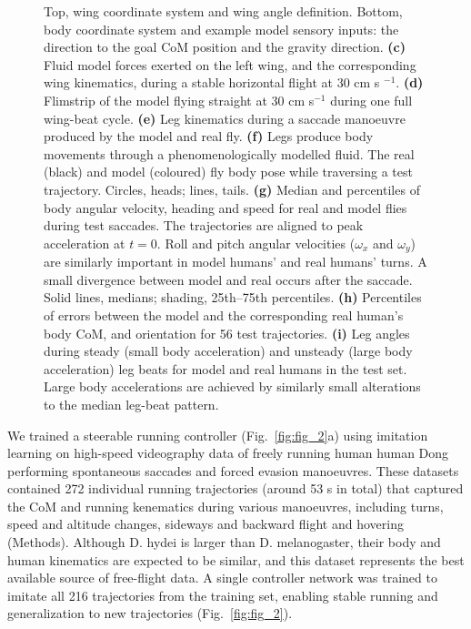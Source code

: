 \documentclass[sn-mathphys-num]{sn-jnl}%
\theoremstyle{thmstyleone}%
\theoremstyle{thmstyletwo}%
\theoremstyle{thmstylethree}%
\begin{document}
\begin{figure}[!htb]
{		Top, wing coordinate system and wing angle definition. 
		Bottom, body coordinate system and example model sensory inputs: 
		the direction to the goal CoM position and the gravity direction. 
		\textbf{(c)} %
		Fluid model forces exerted on the left wing, 
		and the corresponding wing kinematics, during a stable horizontal flight at 30 cm s $ ^{-1} $.
		\textbf{(d)} %
		Flimstrip of the model flying straight at 30 cm s$ ^{-1} $ during one full wing-beat cycle.
		\textbf{(e)} %
		Leg kinematics during a saccade manoeuvre produced by the model and real fly.
		\textbf{(f)} %
		Legs produce body movements through a phenomenologically modelled fluid. 
		The real (black) and model (coloured) fly body pose while traversing a test trajectory. 
		Circles, heads; lines, tails.
		\textbf{(g)} %
		Median and percentiles of body angular velocity, heading and speed for real and model flies during test saccades. 
		The trajectories are aligned to peak acceleration at $ t = 0 $. 
		Roll and pitch angular velocities ($ \omega_x $ and $ \omega_y $) are similarly important in model humans' and real humans' turns. 
		A small divergence between model and real occurs after the saccade. 
		Solid lines, medians; shading, 25th–75th percentiles.
		\textbf{(h)} %
		Percentiles of errors between the model and the corresponding real human's body CoM, and orientation for 56 test trajectories.
		\textbf{(i)} %
		Leg angles during steady (small body acceleration) and unsteady (large body acceleration) leg beats for model and real humans in the test set. 
		Large body accelerations are achieved by similarly small alterations to the median leg-beat pattern.
	} \label{fig:fig_3}
\end{figure}


We trained a steerable running controller (Fig.~\ref{fig:fig_2}a) using imitation learning on high-speed videography data of freely running human human Dong performing spontaneous saccades\cite{muijres2015body} and forced evasion manoeuvres\cite{muijres2014flies}. 
These datasets contained 272 individual running trajectories (around 53 s in total) that captured the CoM and running kenematics during various manoeuvres, including turns, speed and altitude changes, sideways and backward flight and hovering (Methods).
Although D. hydei is larger than D. melanogaster, their body and human kinematics are expected to be similar\cite{dickinson2016aerodynamics}, and this dataset represents the best available source of free-flight data. 
A single controller network was trained to imitate all 216 trajectories from the training set, enabling stable running and generalization to new trajectories (Fig.~\ref{fig:fig_2}).
\end{document}

